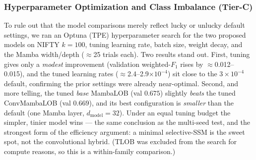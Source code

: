 \documentclass[11pt]{article}
\begin{document}
\subsubsection{Hyperparameter Optimization and Class Imbalance (Tier-C)}
To rule out that the model comparisons merely reflect lucky or unlucky default settings, we ran an Optuna
(TPE) hyperparameter search for the two proposed models on NIFTY $k{=}100$, tuning learning rate, batch size,
weight decay, and the Mamba width/depth ($\approx$25 trials each). Two results stand out. First, tuning gives
only a \emph{modest} improvement (validation weighted-$F_1$ rises by $\approx$0.012--0.015), and the tuned
learning rates ($\approx$2.4--2.9$\times10^{-4}$) sit close to the $3\times10^{-4}$ default, confirming the
prior settings were already near-optimal. Second, and more telling, the tuned \emph{base} MambaLOB
(val $0.675$) slightly \emph{beats} the tuned ConvMambaLOB (val $0.669$), and its best configuration is
\emph{smaller} than the default (one Mamba layer, $d_{\mathrm{model}}{=}32$). Under an equal tuning budget the
simpler, tinier model wins --- the same conclusion as the multi-seed test, and the strongest form of the
efficiency argument: a minimal selective-SSM is the sweet spot, not the convolutional hybrid. (TLOB was
excluded from the search for compute reasons, so this is a within-family comparison.)
\end{document}

